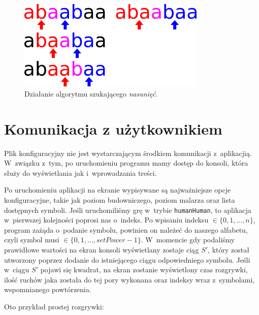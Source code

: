 \documentclass[document]{xmgr}
\begin{document}
\begin{figure}[tbh]
    \centering
    \includegraphics[width = 0.8\textwidth]{images/overlapFinding}
    \caption{Działanie algorytmu szukającego \emph{nasunięć}.}
    \label{fig:overlapFinding}
\end{figure}

\section{Komunikacja z użytkownikiem}
Plik konfiguracyjny nie jest wystarczającym środkiem komunikacji z~aplikacjią. W~związku z~tym, po uruchomieniu programu mamy dostęp do konsoli, która służy do wyświetlania jak i~wprowadzania treści.

Po uruchomieniu aplikacji na ekranie wypisywane są najważniejsze op\-cje konfiguracyjne, takie jak poziom budowniczego, poziom malarza oraz lista dostępnych symboli. Jeśli uruchomiliśmy grę w~trybie \texttt{humanHuman}, to aplikacja w~pierwszej kolejności poprosi nas o~indeks. Po wpisaniu indeksu  \mbox{$\in \{0, 1, ...,n\}$}, program zażąda o~podanie symbolu, powinien on należeć do naszego alfabetu, czyli symbol musi \mbox{$\in \{0, 1, ..., setPower-1\}$}. W~momencie gdy podaliśmy prawidłowe wartości na ekran konsoli wyświetlany zostaje ciąg $S'$, który został utworzony poprzez dodanie do istniejącego ciągu odpowiedniego symbolu. Jeśli w~ciągu $S'$ pojawi się kwadrat, na ekran zostanie wyświetlony czas rozgrywki, ilość ruchów jaka została do tej pory wykonana oraz indeksy wraz z~symbolami, wspomnianego powtórzenia.

Oto przykład prostej rozgrywki:
\end{document}
